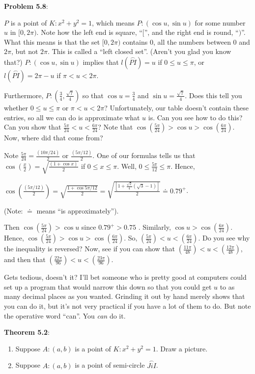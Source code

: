 \documentclass[english]{book}
\newcommand{\arc}[1]{\overset{\frown}{#1} }
\begin{document}
\textbf{Problem 5.8}: 

$P$ is a point of $K:x^{2}+y^{2}=1$, which means $P:(\cos u, \sin u)$ for some number $u$ in $[0,2\pi)$. Note how the left end is square, ``$[$'', and the right end is round, ``$)$''. What this means is that the set $[0,2\pi)$ contains $0$, all the numbers between $0$ and $2\pi$, but not $2\pi$. This is called a ``left closed set''. (Aren't you glad you know that?) $P:(\cos u,\sin u)$ implies that $l(\arc{PI})=u$ if $0 \leq u \leq \pi$, or $l(\arc{PI})=2\pi-u$ if $\pi < u < 2\pi$.

Furthermore, $P:(\frac{3}{4}, \frac{\sqrt{7}}{4})$ so that $\cos u = \frac{3}{4}$ and $\sin u = \frac{\sqrt{7}}{4}$. Does this tell you whether $0 \leq u \leq \pi$ or $\pi < u < 2\pi$? Unfortunately, our table doesn't contain these entries, so all we can do is approximate what $u$ is. Can you see how to do this? Can you show that $\frac{5\pi}{24} < u < \frac{6\pi}{24}$? Note that $\cos (\frac{5\pi}{24}) > \cos u > \cos (\frac{6\pi}{24})$. Now, where did that come from?

Note $\frac{5\pi}{24}=\frac{(10\pi/24)}{2}$ or $\frac{(5\pi/12)}{2}$. One of our formulas tells us that $\cos(\frac{x}{2})=\sqrt{\frac{(1+\cos x)}{2}}$ if $0\leq x\leq\pi$. Well, $0\leq\frac{5\pi}{12}\leq\pi$. Hence,

$\cos (\frac{(5\pi/12)}{2}) = \sqrt{\frac{1+\cos5\pi/12}{2}} = \sqrt{\frac{[1+\frac{\sqrt{2}}{4} (\sqrt{3}-1)]}{2}} \doteq 0.79^{+}$.

(Note: $\doteq$ means ``is approximately'').

Then $\cos (\frac{5\pi}{24}) > \cos u$ since $0.79^{+} > 0.75$ . Similarly, $\cos u > \cos (\frac{6\pi}{24})$. Hence, $\cos (\frac{5\pi}{24}) > \cos u > \cos (\frac{6\pi}{24})$. So, $(\frac{5\pi}{24}) < u < (\frac{6\pi}{24})$. Do you see why the inequality is reversed? Now, see if you can show that $(\frac{11\pi}{48}) < u < (\frac{12\pi}{48})$, and then that $(\frac{22\pi}{96}) < u < (\frac{23\pi}{96})$. 

Gets tedious, doesn't it? I'll bet someone who is pretty good at computers could set up a program that would narrow this down so that you could get $u$ to as many decimal places as you wanted. Grinding it out by hand merely shows that you can do it, but it's not very practical if you have a lot of them to do. But note the operative word ``can''. You \emph{can} do it.

\vspace{0.3cm}

\textbf{Theorem 5.2}:
\begin{enumerate}[\hspace{1cm}1)]
  \item Suppose $A:(a,b)$ is a point of $K:x^{2}+y^{2}=1$. Draw a picture.
  \item Suppose $A:(a,b)$ is a point of semi-circle $\arc{JiI}$.
\end{enumerate}
\end{document}

